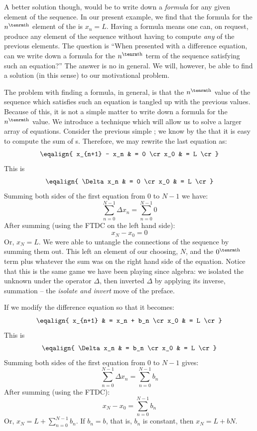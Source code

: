 A better solution though, would be to write down a {\it formula\/} for 
any given element of the sequence. In our present example, we find 
that the formula 
for the $n^{\rm th}$ element of the  is $x_n = L$. Having a formula 
means one can, on request, produce any element of the sequence without 
having to compute {\it any\/} of the previous elements. 
The question is 
\goodbreak
``When presented with a difference equation, can we write down a formula 
for the $n^{\rm th}$ term of the sequence satisfying such an equation?''
The answer is no in general. We will, however, be able to find a solution (in this sense) to our motivational problem.

The problem with 
finding a formula, in general, is that the $n^{\rm th}$ value of the sequence 
which satisfies such an equation is tangled up with the previous values. 
Because of this, it is not a simple matter to write down a formula 
for the $n^{\rm th}$ value. We introduce a technique 
which will allow us to solve a larger array of equations.
Consider the previous simple ; 
we know by the  that 
it is easy to compute the sum of s. Therefore, 
we may rewrite the last equation as:
$$
\eqalign{
x_{n+1} - x_n & = 0 \cr
x_0 & = L \cr
}
$$
This is
$$
\eqalign{
\Delta x_n & = 0 \cr
x_0 & = L \cr
}
$$
Summing both sides of the first equation from $0$ to $N-1$ we have:
$$
\sum_{n=0}^{N-1} \Delta x_n = \sum_{n=0}^{N-1} 0 
$$
After summing (using the FTDC on the left hand side):
$$
x_N - x_0 = 0
$$
Or, $x_N = L$.
We were able to untangle the connections of the sequence by summing them out.
This left an element of our choosing, $N$, and the $0^{\rm th}$ term plus
whatever the sum was on the right hand side of the equation.
Notice that this is the same game we have been playing since algebra: we
isolated the unknown under the operator $\Delta$, then inverted $\Delta$ by
applying its inverse, summation -- the {\it isolate and invert\/} move of the preface.

If we modify the difference equation so that it becomes:
$$
\eqalign{
x_{n+1} & = x_n + b_n \cr
x_0 & = L \cr
}
$$
This is
$$
\eqalign{
\Delta x_n & = b_n \cr
x_0 & = L \cr
}
$$
Summing both sides of the first equation from $0$ to $N-1$ gives:
$$
\sum_{n=0}^{N-1} \Delta x_n = \sum_{n=0}^{N-1} b_n 
$$
After summing (using the FTDC):
$$
x_N - x_0 = \sum_{n=0}^{N-1} b_n
$$
Or, $x_N = L + \sum_{n=0}^{N-1} b_n$. If $b_n = b$, that is, 
$b_n$ is constant, then $x_N = L + b N$.

